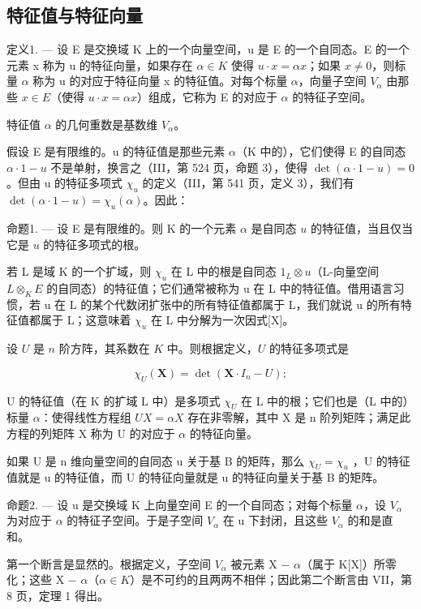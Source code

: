 \subsection{特征值与特征向量}

定义1. --- 设 E 是交换域 K 上的一个向量空间，u 是 E 的一个自同态。E 的一个元素 x 称为 u 的特征向量，如果存在 \(\alpha \in K\) 使得 \(u \cdot x = \alpha x\)；如果 \(x \neq 0\)，则标量 \(\alpha\) 称为 u 的对应于特征向量 x 的特征值。对每个标量 \(\alpha\)，向量子空间 \(V_{\alpha}\) 由那些 \(x \in E\)（使得 \(u \cdot x = \alpha x\)）组成，它称为 E 的对应于 \(\alpha\) 的特征子空间。

特征值 \(\alpha\) 的几何重数是基数维 \(V_{\alpha}\)。

假设 E 是有限维的。u 的特征值是那些元素 \(\alpha\)（K 中的），它们使得 E 的自同态 \(\alpha \cdot 1 - u\) 不是单射，换言之（III，第 524 页，命题 3），使得 \(\det(\alpha \cdot 1 - u) = 0\)。但由 u 的特征多项式 \(\chi_{u}\) 的定义（III，第 541 页，定义 3），我们有 \(\det(\alpha \cdot 1 - u) = \chi_{u}(\alpha)\)。因此：

命题1. --- 设 E 是有限维的。则 K 的一个元素 \(\alpha\) 是自同态 \(u\) 的特征值，当且仅当它是 \(u\) 的特征多项式的根。

若 L 是域 K 的一个扩域，则 \(\chi_{u}\) 在 L 中的根是自同态 \(1_{L} \otimes u\)（L-向量空间 \(L \otimes_{K} E\) 的自同态）的特征值；它们通常被称为 u 在 L 中的特征值。借用语言习惯，若 u 在 L 的某个代数闭扩张中的所有特征值都属于 L，我们就说 u 的所有特征值都属于 L；这意味着 \(\chi_{u}\) 在 L 中分解为一次因式{[}X{]}。

设 \(U\) 是 \(n\) 阶方阵，其系数在 \(K\) 中。则根据定义，\(U\) 的特征多项式是

\[
\chi_ {U} (\mathbf {X}) = \det \left(\mathbf {X} \cdot I _ {n} - U\right);
\]

U 的特征值（在 K 的扩域 L 中）是多项式 \(\chi_{U}\) 在 L 中的根；它们也是（L 中的）标量 \(\alpha\)：使得线性方程组 \(UX = \alpha X\) 存在非零解，其中 X 是 n 阶列矩阵；满足此方程的列矩阵 X 称为 U 的对应于 \(\alpha\) 的特征向量。

如果 U 是 n 维向量空间的自同态 u 关于基 B 的矩阵，那么 \(\chi_{U} = \chi_{u}\) ，U 的特征值就是 u 的特征值，而 U 的特征向量就是 u 的特征向量关于基 B 的矩阵。

命题2. --- 设 u 是交换域 K 上向量空间 E 的一个自同态；对每个标量 \(\alpha\)，设 \(V_{\alpha}\) 为对应于 \(\alpha\) 的特征子空间。于是子空间 \(V_{\alpha}\) 在 u 下封闭，且这些 \(V_{\alpha}\) 的和是直和。

第一个断言是显然的。根据定义，子空间 \(V_{\alpha}\) 被元素 X − \(\alpha\)（属于 K{[}X{]}）所零化；这些 X − \(\alpha\)（\(\alpha \in K\)）是不可约的且两两不相伴；因此第二个断言由 VII，第 8 页，定理 1 得出。


